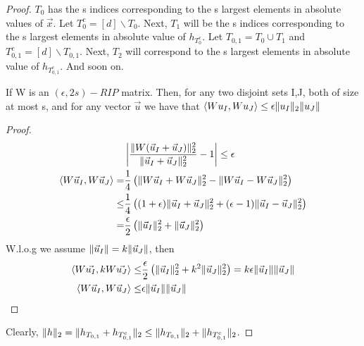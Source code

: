 \begin{theorem}
\begin{proof}
        $ T_0 $ has the s indices corresponding to the s largest elements in absolute values of $ \vec{x} $.
        Let $ T^c_0 = [d] \backslash T_0 $. Next, $ T_1 $ will be the s indices corresponding to the s largest elements in absolute value of $ h_{T^c_0} $. Let $ T_{0,1} = T_0 \cup T_1 $ and $ T^{c}_{0,1} = [d] \backslash T_{0,1} $. Next, $ T_2 $ will correspond to the s largest elements in absolute value of $ h_{T^c_{0,1}} $. And soon on.
        \begin{lemma}
            If W is an $ (\epsilon, 2s)-RIP $ matrix. Then, for any two disjoint sets I,J, both of size at most s, and for any vector $ \vec{u} $ we have that $ \langle W u_I, W u_J \rangle \le \epsilon \Arrowvert u_I \Arrowvert_2 \Arrowvert u_J \Arrowvert $
            \begin{proof}
                \begin{align*}
                    &\left| \frac{\Arrowvert W (\vec{u}_I + \vec{u}_J) \Arrowvert^2_2}{\Arrowvert \vec{u}_I + \vec{u}_J \Arrowvert^2_2} - 1 \right| \le \epsilon\\
                    \langle W \vec{u}_I, W \vec{u}_J \rangle
                    =& \frac{1}{4} \left( \Arrowvert W \vec{u}_I + W \vec{u}_J \Arrowvert^2_2 - \Arrowvert W \vec{u}_I - W \vec{u}_J \Arrowvert^2_2 \right)\\
                    \le& \frac{1}{4} \left( (1+\epsilon) \Arrowvert \vec{u}_I + \vec{u}_J \Arrowvert^2_2  + (\epsilon - 1) \Arrowvert \vec{u}_I - \vec{u}_J \Arrowvert^2_2\right) \\
                    =& \frac{\epsilon}{2} \left( \Arrowvert \vec{u}_I \Arrowvert^2_2 + \Arrowvert \vec{u}_J \Arrowvert^2_2 \right)
                \end{align*}
                {W.l.o.g} we assume $ \Arrowvert \vec{u}_I \Arrowvert  = k \Arrowvert \vec{u}_J \Arrowvert$, then
                \begin{align*}
                    \langle W \vec{u_I}, kW \vec{u_J} \rangle \le& \frac{\epsilon}{2} \left( \Arrowvert \vec{u}_I \Arrowvert^2_2 + k^2 \Arrowvert \vec{u}_J \Arrowvert^2_2 \right) = k \epsilon \Arrowvert \vec{u}_I \Arrowvert \Arrowvert \vec{u}_J \Arrowvert\\
                    \langle W \vec{u}_I, W \vec{u}_J \rangle \le& \epsilon \Arrowvert \vec{u}_I \Arrowvert \Arrowvert \vec{u}_J \Arrowvert
                \end{align*}
            \end{proof}
        \end{lemma}
        Clearly, $ \Arrowvert h \Arrowvert_2 = \Arrowvert h_{T_{0,1}} + h_{T^c_{0,1}}\Arrowvert_2 \le \Arrowvert h_{T_{0,1}} \Arrowvert_2 + \Arrowvert h_{T^{c}_{0,1}} \Arrowvert_2 $.


\end{proof}
\end{theorem}
